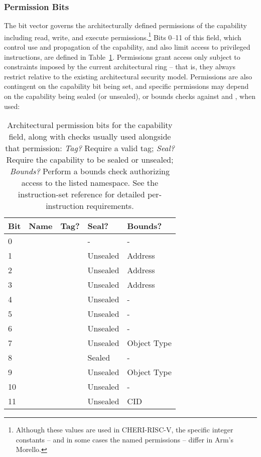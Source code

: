\subsubsection{Permission Bits}
\label{sect:capability-permission-bits}

The \cperms{} bit vector governs the architecturally defined permissions of
the capability including read, write, and execute
permissions.\footnote{Although these values are used in
CHERI-RISC-V, the specific integer constants -- and in some cases the named
permissions -- differ in Arm's Morello.}
Bits 0--11 of this field, which control use and propagation of the
capability, and also limit access to privileged instructions, are defined in
Table~\ref{table:capability-permission-bits}.
Permissions grant access only subject to constraints imposed by the current
architectural ring -- that is, they always restrict relative to the existing
architectural security model.
Permissions are also contingent on the capability \ctag{} bit being set, and
specific permissions may depend on the capability being sealed (or unsealed), or
bounds checks against \cbase{} and \clength{}, when used:

\begin{table}
\begin{center}
\begin{tabular}{llcll}
\toprule
Bit & Name		& Tag?		& Seal?		& Bounds? \\
\midrule
0 & \cappermG		& \checkmark	& -		& - \\
1 & \cappermX		& \checkmark	& Unsealed	& Address\\
2 & \cappermL		& \checkmark	& Unsealed	& Address\\
3 & \cappermS		& \checkmark	& Unsealed	& Address\\
4 & \cappermLC		& \checkmark	& Unsealed 	& - \\
5 & \cappermSC		& \checkmark	& Unsealed	& - \\
6 & \cappermSLC		& \checkmark	& Unsealed	& - \\
7 & \cappermSeal	& \checkmark	& Unsealed	& Object Type \\
8 & \cappermInvoke	& \checkmark	& Sealed	& - \\
9 & \cappermUnseal	& \checkmark	& Unsealed	& Object Type \\
10 & \cappermASR	& \checkmark	& Unsealed	& - \\
11 & \cappermCid	& \checkmark	& Unsealed	& CID \\
\bottomrule
\end{tabular}
\end{center}
\caption{Architectural permission bits for the \cperms{} capability field,
  along with checks usually used alongside that permission: \textit{Tag?}
  Require a valid tag; \textit{Seal?} Require the capability to be sealed or
  unsealed; \textit{Bounds?} Perform a bounds check authorizing access to
  the listed namespace.
  See the instruction-set reference for detailed per-instruction
  requirements.}
\label{table:capability-permission-bits}
\end{table}

